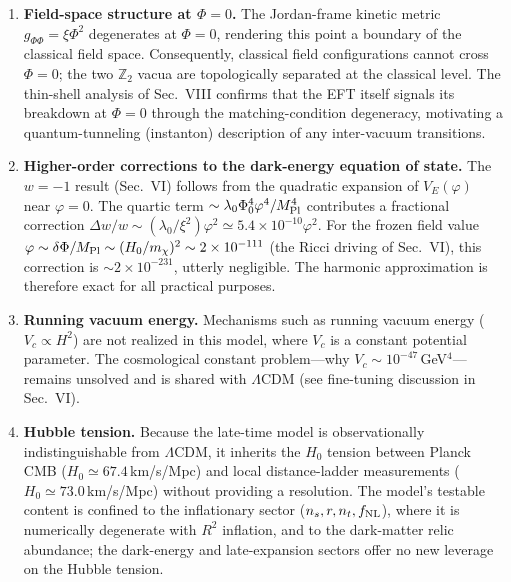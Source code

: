 \documentclass[pdflatex,sn-mathphys-num]{sn-jnl}
\newcommand{\MP}{M_{\rm Pl}}
\newcommand{\Ztwo}{\mathbb{Z}_2}
\newcommand{\PhiV}{\Phi_0}
\theoremstyle{thmstyleone}
\begin{document}
\begin{enumerate}
\item \textbf{Field-space structure at $\Phi=0$.} The Jordan-frame kinetic metric $g_{\Phi\Phi}=\xi\Phi^2$ degenerates at $\Phi=0$, rendering this point a boundary of the classical field space. Consequently, classical field configurations cannot cross $\Phi=0$; the two $\Ztwo$ vacua are topologically separated at the classical level. The thin-shell analysis of Sec.~VIII confirms that the EFT itself signals its breakdown at $\Phi=0$ through the matching-condition degeneracy, motivating a quantum-tunneling (instanton) description of any inter-vacuum transitions.

\item \textbf{Higher-order corrections to the dark-energy equation of state.} The $w=-1$ result (Sec.~VI) follows from the quadratic expansion of $V_E(\varphi)$ near $\varphi=0$. The quartic term $\sim\lambda_0\PhiV^4\varphi^4/\MP^4$ contributes a fractional correction $\Delta w/w\sim(\lambda_0/\xi^2)\varphi^2\simeq5.4\times10^{-10}\varphi^2$. For the frozen field value $\varphi\sim\delta\Phi/\MP\sim(H_0/m_\chi)^2\sim2\times10^{-111}$ (the Ricci driving of Sec.~VI), this correction is $\sim2\times10^{-231}$, utterly negligible. The harmonic approximation is therefore exact for all practical purposes.

\item \textbf{Running vacuum energy.} Mechanisms such as running vacuum energy ($V_c\propto H^2$) are not realized in this model, where $V_c$ is a constant potential parameter. The cosmological constant problem---why $V_c\sim10^{-47}\,$GeV$^4$---remains unsolved and is shared with $\Lambda$CDM (see fine-tuning discussion in Sec.~VI).

\item \textbf{Hubble tension.} Because the late-time model is observationally indistinguishable from $\Lambda$CDM, it inherits the $H_0$ tension between Planck CMB ($H_0\simeq67.4\,$km/s/Mpc) and local distance-ladder measurements ($H_0\simeq73.0\,$km/s/Mpc) without providing a resolution. The model's testable content is confined to the inflationary sector ($n_s,r,n_t,f_{\rm NL}$), where it is numerically degenerate with $R^2$ inflation, and to the dark-matter relic abundance; the dark-energy and late-expansion sectors offer no new leverage on the Hubble tension.


\end{enumerate}
\end{document}
